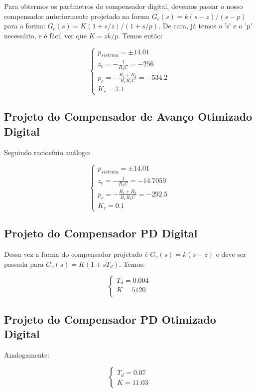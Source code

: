Para obtermos os parâmetros do compensador digital, devemos passar o nosso compensador anteriormente projetado na forma
$G_c(s) = k(s - z)/(s - p)$ para a forma: $G_c(s) = K(1 + s/z)/(1 + s/p)$. De cara, já temos o 's' e o 'p' necessário, e é fácil ver
que $K = zk/p$. Temos então:

\begin{equation}
    \left\{ \begin{array}{l}
     p_{sistema} = \pm 14.01 \\
     z_{c} = -\frac{1}{R_1C} = -256 \\
     p_{c} = -\frac{R_1 + R_2}{R_1R_2C} = -534.2\\
     K_{c} = 7.1
    \end{array}\right.
\end{equation}

\subsection{Projeto do Compensador de Avanço Otimizado Digital}

Seguindo raciocínio análogo:

\begin{equation}
    \left\{ \begin{array}{l}
     p_{sistema} = \pm 14.01 \\
     z_{c} = -\frac{1}{R_1C} =  -14.7059 \\
     p_{c} = -\frac{R_1 + R_2}{R_1R_2C} = -292.5\\
     K_{c} = 0.1
    \end{array}\right.
\end{equation}

\subsection{Projeto do Compensador PD Digital}

Dessa vez a forma do compensador projetado é $G_c(s) = k(s - z)$ e deve ser passada para  $G_c(s) = K(1 + sT_d)$. Temos:

\begin{equation}
 \left\{ \begin{array}{l}
    T_d = 0.004 \\
    K = 5120 \\
    \end{array}\right.
\end{equation}

\subsection{Projeto do Compensador PD Otimizado Digital}

Analogamente:

\begin{equation}
    \left\{ \begin{array}{l}
     T_d = 0.07 \\
     K = 11.03
    \end{array}\right.
\end{equation}

